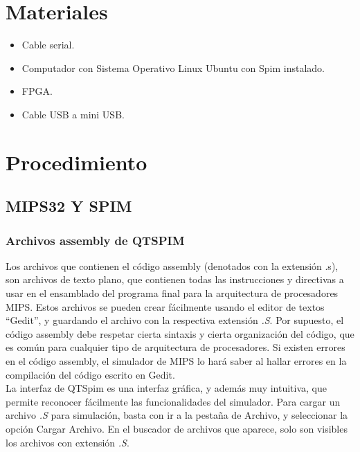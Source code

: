 \documentclass[twocolumn]{IEEEtran}
\begin{document}
\section{Materiales}
\begin{itemize}
 \item Cable serial.
 \item Computador con Sistema Operativo Linux Ubuntu con Spim instalado.
 \item FPGA.
 \item Cable USB a mini USB.
\end{itemize}

\section{Procedimiento}
\noindent
\subsection{MIPS32 Y SPIM}
\noindent
\subsubsection{Archivos assembly de QTSPIM}
\noindent
Los archivos que contienen el código assembly (denotados con la extensión .s), son archivos de texto plano, que contienen todas las instrucciones y directivas a usar en el ensamblado del programa final para la arquitectura de procesadores MIPS. Estos archivos se pueden crear fácilmente usando el editor de textos “Gedit”, y guardando el archivo con la respectiva extensión \textit{.S}. Por supuesto, el código assembly debe respetar cierta sintaxis y cierta organización del código, que es común para cualquier tipo de arquitectura de procesadores. Si existen errores en el código assembly, el simulador de MIPS lo hará saber al hallar errores en la compilación del código escrito en Gedit.\\
\noindent
La interfaz de QTSpim es una interfaz gráfica, y además muy intuitiva, que permite reconocer fácilmente las funcionalidades del simulador. Para cargar un archivo \textit{.S} para simulación, basta con ir a la pestaña de Archivo, y seleccionar la opción Cargar Archivo. En el buscador de archivos que aparece, solo son visibles los archivos con extensión \textit{.S}.
\end{document}
